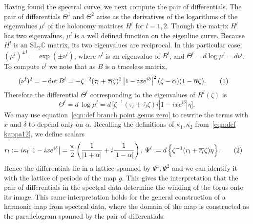 \documentclass{article}
\numberwithin{equation}{section}
\numberwithin{figure}{section}
\newcommand{\labelthis}[1]{\addtocounter{equation}{1}\tag{\theequation}\label{#1}}
\renewcommand*{\bar}{\overline}
\newcommand{\bra}[1]{\left(#1\right)}
\newcommand{\abs}[1]{\left|#1\right|}
\newcommand{\iu}{i}
\newcommand{\C}{\mathbb{C}}
\newcommand{\SL}{\mathrm{SL}}
\begin{document}
Having found the spectral curve, we next compute the pair of differentials. The pair of differentials $\Theta^1$ and $\Theta^2$ arise as the derivatives of the logarithms of the eigenvalues $\mu^l$ of the holonomy matrices $H^l$ for $l=1,2$. Though the matrix $H^l$ has two eigenvalues, $\mu^l$ is a well defined function on the eigenline curve. Because $H^l$ is an $\SL_2\C$ matrix, its two eigenvalues are reciprocal. In this particular case, $(\mu^l)^{\pm 1} = \exp (\pm \nu^l)$, where $\nu^l$ is an eigenvalue of $B^l$, and $\Theta^l = d\log \mu^l = d\nu^l$. To compute $\nu^l$ we note that as $B$ is a traceless matrix,
\begin{align*}
(\nu^l)^2
= -\det B^l
&= -\zeta^{-2}(\tau_l + \bar{\tau_l}\zeta)^2 \abs{1- \iu xe^{\iu \delta}}^2 (\zeta-\alpha)(1-\bar{\alpha}\zeta).
\labelthis{eqn:eigenvalue}
\end{align*}
Therefore the differential $\Theta^l$ corresponding to the eigenvalues of $H^l(\zeta)$ is
\[
\Theta^l = d\,\log \mu^l = d\, \Big[ \zeta^{-1}(\tau_l + \bar{\tau_l}\zeta) \iu \abs{1 - \iu xe^{\iu \delta}} \eta \Big].
\]
We may use equation~\eqref{eqn:def branch point genus zero} to rewrite the terms with $x$ and $\delta$ to depend only on $\alpha$.
Recalling the definitions of $\kappa_1,\kappa_2$ from~\eqref{eqn:def kappa12}, we define scalars
\begin{align*}
r_l &:= \iu \kappa_l \abs{1-\iu x e^{\iu \delta}} = \frac{\pi}{2}\bra{ \frac{1}{\abs{1+\alpha}} + \iu \frac{1}{\abs{1-\alpha}} },
\,
\Psi^l := d\, \Big\{ \zeta^{-1}(r_l + \bar{r_l}\zeta) \eta \Big\}. 
\labelthis{eqn:genus zero differential basis}
\end{align*}
Hence the differentials lie in a lattice spanned by $\Psi^1, \Psi^2$ and we can identify it with the lattice of periods of the map $g$. This gives the interpretation that the pair of differentials in the spectral data determine the winding of the torus onto its image. This same interpretation holds for the general construction of a harmonic map from spectral data, where the domain of the map is constructed as the parallelogram spanned by the pair of differentials.
\end{document}
